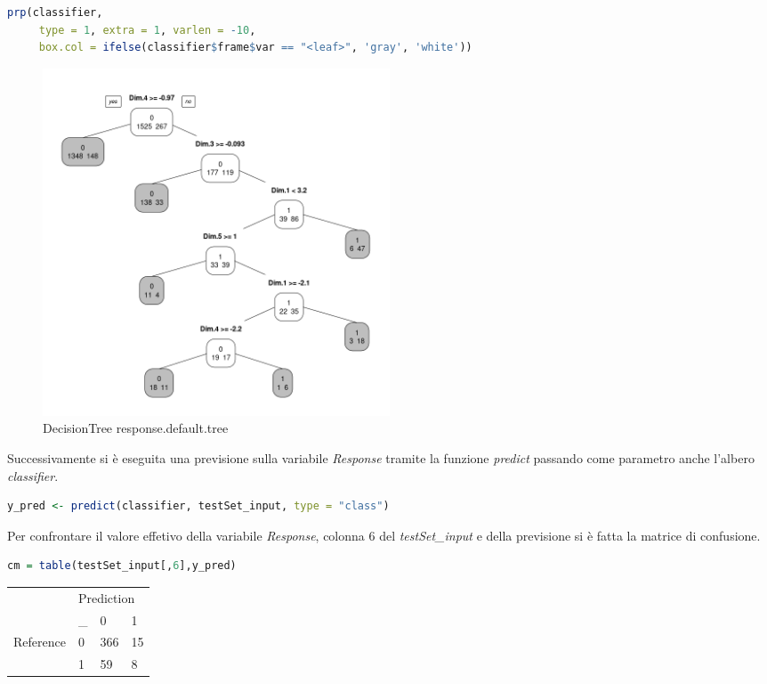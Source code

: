 \documentclass[letterpaper,11pt]{article}
\begin{document}
\begin{lstlisting}[language=R]
prp(classifier, 
     type = 1, extra = 1, varlen = -10, 
     box.col = ifelse(classifier$frame$var == "<leaf>", 'gray', 'white'))
\end{lstlisting}

\begin{figure}[H]
    \centering
    \includegraphics[width=0.5\textwidth]{Img/D-TREE/D-TREE001.png}
    \caption{DecisionTree response.default.tree}
\end{figure}


Successivamente si è eseguita una previsione sulla variabile \textit{Response} tramite la funzione \textit{predict} passando come parametro anche l'albero \textit{classifier}. 

\begin{lstlisting}[language=R]
y_pred <- predict(classifier, testSet_input, type = "class")
\end{lstlisting}

Per confrontare il valore effetivo della variabile \textit{Response}, colonna 6 del \textit{testSet\_input}  e della previsione si è fatta la matrice di confusione. 

\begin{lstlisting}[language=R]
cm = table(testSet_input[,6],y_pred)
\end{lstlisting}



\begin{table}[h!]
\centering
\begin{tabular}{|ll|lll|}
\hline
\multicolumn{2}{|l|}{\multirow{2}{*}{}} & \multicolumn{3}{l|}{Prediction}                        \\ \cline{3-5} 
\multicolumn{2}{|l|}{}                  & \multicolumn{1}{c|}{\_} & \multicolumn{1}{l|}{0}  & 1  \\ \hline
\multicolumn{2}{|l|}{\multirow{2}{*}{Reference}} & \multicolumn{1}{l|}{0} & \multicolumn{1}{l|}{366} & 15 \\ \cline{3-5} 
\multicolumn{2}{|l|}{}                  & \multicolumn{1}{l|}{1} & \multicolumn{1}{l|}{59} & 8 \\ \hline
\end{tabular}
\end{table}
\end{document}
